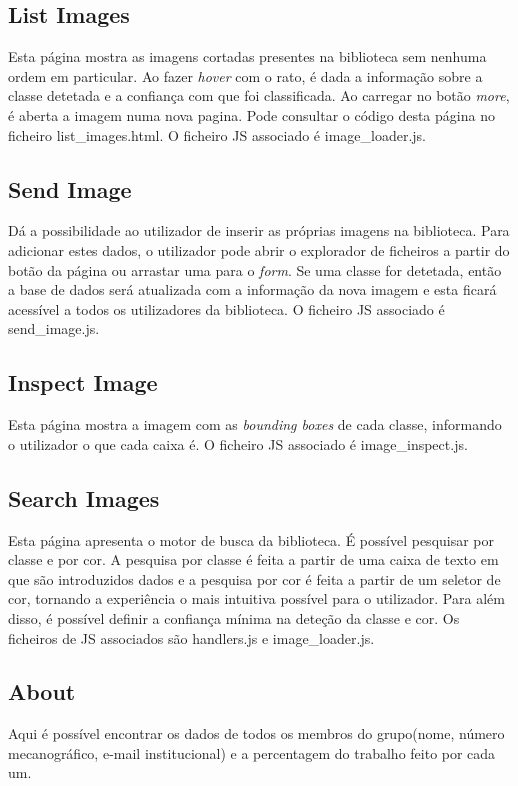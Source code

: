\documentclass{report}
\begin{document}
\subsection{List Images}
Esta página mostra as imagens cortadas presentes na biblioteca sem nenhuma ordem em particular. Ao fazer \textit{hover} com o rato, é dada a informação sobre a classe detetada e a confiança com que foi classificada. Ao carregar no botão \textit{more}, é aberta a imagem numa nova pagina. Pode consultar o código desta página no ficheiro list\_images.html. O ficheiro \ac{JS} associado é image\_loader.js.


\subsection{Send Image}
Dá a possibilidade ao utilizador de inserir as próprias imagens na biblioteca. Para adicionar estes dados, o utilizador pode abrir o explorador de ficheiros a partir do botão da página ou arrastar uma para o \textit{form}. Se uma classe for detetada, então a base de dados será atualizada com a informação da nova imagem e esta ficará acessível a todos os utilizadores da biblioteca. O ficheiro \ac{JS} associado é send\_image.js.

\subsection{Inspect Image}
Esta página mostra a imagem  com as \textit{bounding boxes} de cada classe, informando o utilizador o que cada caixa é. O ficheiro \ac{JS} associado é image\_inspect.js.

\subsection{Search Images}
Esta página apresenta o motor de busca da biblioteca. É possível pesquisar por classe e por cor. 
A pesquisa por classe é feita a partir de uma caixa de texto em que são introduzidos dados e a pesquisa por cor é feita a partir de um seletor de cor, tornando a experiência o mais intuitiva possível para o utilizador. Para além disso, é possível definir a confiança mínima na deteção da classe e cor. Os ficheiros de \ac{JS} associados são handlers.js e image\_loader.js.

\subsection{About}
Aqui é possível encontrar os dados de todos os membros do grupo(nome, número mecanográfico, e-mail institucional) e a percentagem do trabalho feito por cada um.
\end{document}
